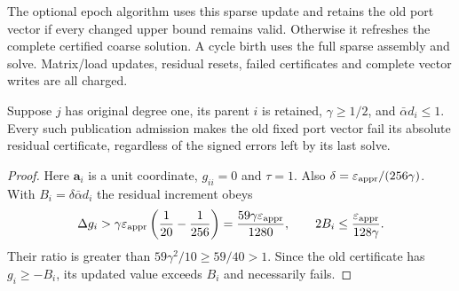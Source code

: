 The optional epoch algorithm uses this sparse update and retains the old
port vector if every changed upper bound remains valid. Otherwise it
refreshes the complete certified coarse solution. A cycle birth uses the
full sparse assembly and solve. Matrix/load updates, residual resets,
failed certificates and complete vector writes are all charged.

\begin{lemma}
\label{lem:op3-forced-leaf-refresh}
Suppose $j$ has original degree one, its parent $i$ is retained,
$\gamma\geq1/2$, and $\bar\alpha d_i\leq1$. Every such publication
admission makes the old fixed port vector fail its absolute residual
certificate, regardless of the signed errors left by its last solve.
\end{lemma}
\begin{proof}
Here $\bm a_i$ is a unit coordinate, $g_{ii}=0$ and $\tau=1$.
Also $\delta=\varepsilon_{\mathrm{appr}}/(256\gamma)$. With
$B_i=\delta\bar\alpha d_i$ the residual increment obeys
\[
 \Delta g_i>\gamma\varepsilon_{\mathrm{appr}}\left(\frac1{20}-\frac1{256}\right)
 =\frac{59\gamma\varepsilon_{\mathrm{appr}}}{1280},\qquad
 2B_i\leq\frac{\varepsilon_{\mathrm{appr}}}{128\gamma}.
\]
Their ratio is greater than $59\gamma^2/10\geq59/40>1$.
Since the old certificate has $g_i\geq-B_i$, its updated value exceeds
$B_i$ and necessarily fails.
\end{proof}

